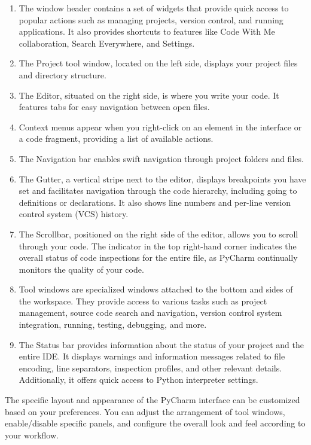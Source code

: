 \begin{enumerate}
	\item The window header contains a set of widgets that provide quick access to popular actions such as managing projects, version control, and running applications. It also provides shortcuts to features like Code With Me collaboration, Search Everywhere, and Settings.
	\item The Project tool window, located on the left side, displays your project files and directory structure.
	\item The Editor, situated on the right side, is where you write your code. It features tabs for easy navigation between open files.
	\item Context menus appear when you right-click on an element in the interface or a code fragment, providing a list of available actions.
	\item The Navigation bar enables swift navigation through project folders and files.
	\item The Gutter, a vertical stripe next to the editor, displays breakpoints you have set and facilitates navigation through the code hierarchy, including going to definitions or declarations. It also shows line numbers and per-line version control system (VCS) history.
	\item The Scrollbar, positioned on the right side of the editor, allows you to scroll through your code. The indicator in the top right-hand corner indicates the overall status of code inspections for the entire file, as PyCharm continually monitors the quality of your code.
	\item Tool windows are specialized windows attached to the bottom and sides of the workspace. They provide access to various tasks such as project management, source code search and navigation, version control system integration, running, testing, debugging, and more.
	\item The Status bar provides information about the status of your project and the entire IDE. It displays warnings and information messages related to file encoding, line separators, inspection profiles, and other relevant details. Additionally, it offers quick access to Python interpreter settings.
\end{enumerate}


The specific layout and appearance of the PyCharm interface can be customized based on your preferences. You can adjust the arrangement of tool windows, enable/disable specific panels, and configure the overall look and feel according to your workflow.

